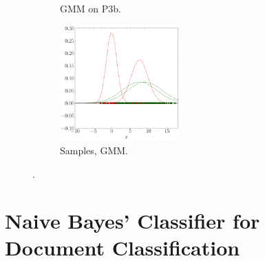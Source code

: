 \documentclass[11pt, a4 paper]{article}
\begin{document}
\begin{figure}[!htbp]
\begin{subfigure}[!htbp]{0.24\textwidth}
       \caption{GMM on P3b.}
       \label{fig:GMM_P3b}
    \end{subfigure}
\quad
    \begin{subfigure}[!htbp]{0.24\textwidth}
       \centering
       \includegraphics[width=1.8in]{../results/ex3/samples_GMM_EM_dataset_P3b_size_199.pdf}
       \caption{Samples, GMM.}
       \label{fig:GMM_DF_P3b}
    \end{subfigure}
\caption{.}
\label{fig:ex3P3b}
\end{figure}



\section{Naive Bayes' Classifier for Document Classification}
\label{sec:docClassification}
\end{document}
